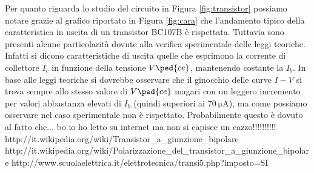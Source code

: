 Per quanto riguarda lo studio del circuito in Figura \ref{fig:transistor} possiamo notare grazie al grafico riportato in Figura \ref{fig:cara} che l'andamento tipico della caratteristica in uscita di un transistor BC107B è rispettata. Tuttavia sono presenti alcune particolarità dovute alla verifica sperimentale delle leggi teoriche. Infatti si dicono caratteristiche di uscita quelle che esprimono la corrente di collettore $I_c$ in funzione della tensione $V\ped{ce}$, mantenendo costante la $I_b$.
In base alle leggi teoriche si dovrebbe osservare che il ginocchio delle curve $I-V$ si trova sempre allo stesso valore di $V\ped{ce}$ magari con un leggero incremento per valori abbastanza elevati di $I_b$ (quindi superiori ai $\SI{70}{\micro\ampere}$), ma come possiamo osservare nel caso sperimentale non è rispettato. Probabilmente questo è dovuto al fatto che... bo io ho letto su internet ma non si capisce un cazzo!!!!!!!!!!
http://it.wikipedia.org/wiki/Transistor_a_giunzione_bipolare
http://it.wikipedia.org/wiki/Polarizzazione_del_transistor_a_giunzione_bipolare
http://www.scuolaelettrica.it/elettrotecnica/transi5.php?imposto=SI